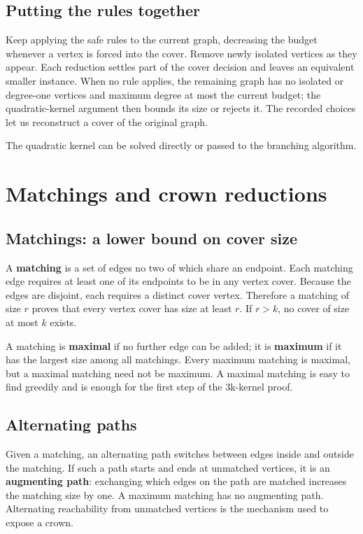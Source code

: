 \documentclass[11pt]{article}
\begin{document}
\subsection{Putting the rules together}

Keep applying the safe rules to the current graph, decreasing the budget whenever a vertex is forced into the cover. Remove newly isolated vertices as they appear. Each reduction settles part of the cover decision and leaves an equivalent smaller instance. When no rule applies, the remaining graph has no isolated or degree-one vertices and maximum degree at most the current budget; the quadratic-kernel argument then bounds its size or rejects it. The recorded choices let us reconstruct a cover of the original graph.

The quadratic kernel can be solved directly or passed to the branching algorithm.

\section{Matchings and crown reductions}

\subsection{Matchings: a lower bound on cover size}

A \textbf{matching} is a set of edges no two of which share an endpoint. Each matching edge requires at least one of its endpoints to be in any vertex cover. Because the edges are disjoint, each requires a distinct cover vertex. Therefore a matching of size $r$ proves that every vertex cover has size at least $r$. If $r>k$, no cover of size at most $k$ exists.

A matching is \textbf{maximal} if no further edge can be added; it is \textbf{maximum} if it has the largest size among all matchings. Every maximum matching is maximal, but a maximal matching need not be maximum. A maximal matching is easy to find greedily and is enough for the first step of the 3k-kernel proof.

\subsection{Alternating paths}

Given a matching, an alternating path switches between edges inside and outside the matching. If such a path starts and ends at unmatched vertices, it is an \textbf{augmenting path}: exchanging which edges on the path are matched increases the matching size by one. A maximum matching has no augmenting path. Alternating reachability from unmatched vertices is the mechanism used to expose a crown.
\end{document}
